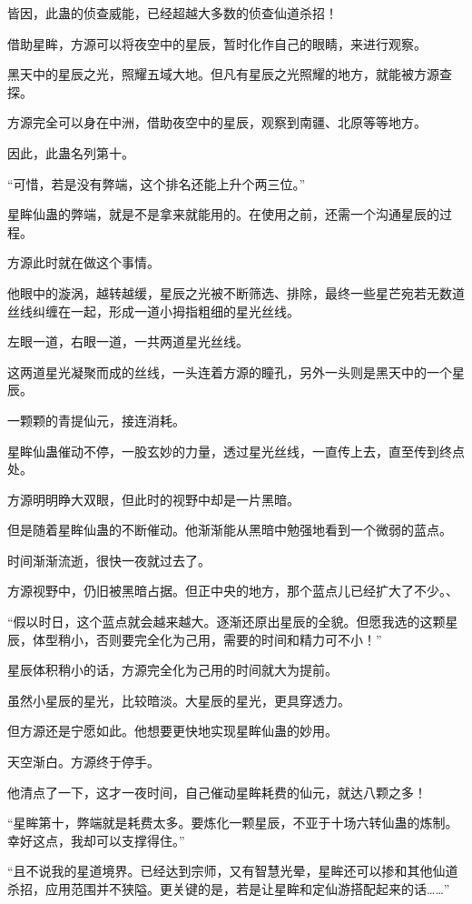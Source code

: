 \begin{this_body}
皆因，此蛊的侦查威能，已经超越大多数的侦查仙道杀招！

借助星眸，方源可以将夜空中的星辰，暂时化作自己的眼睛，来进行观察。

黑天中的星辰之光，照耀五域大地。但凡有星辰之光照耀的地方，就能被方源查探。

方源完全可以身在中洲，借助夜空中的星辰，观察到南疆、北原等等地方。

因此，此蛊名列第十。

“可惜，若是没有弊端，这个排名还能上升个两三位。”

星眸仙蛊的弊端，就是不是拿来就能用的。在使用之前，还需一个沟通星辰的过程。

方源此时就在做这个事情。

他眼中的漩涡，越转越缓，星辰之光被不断筛选、排除，最终一些星芒宛若无数道丝线纠缠在一起，形成一道小拇指粗细的星光丝线。

左眼一道，右眼一道，一共两道星光丝线。

这两道星光凝聚而成的丝线，一头连着方源的瞳孔，另外一头则是黑天中的一个星辰。

一颗颗的青提仙元，接连消耗。

星眸仙蛊催动不停，一股玄妙的力量，透过星光丝线，一直传上去，直至传到终点处。

方源明明睁大双眼，但此时的视野中却是一片黑暗。

但是随着星眸仙蛊的不断催动。他渐渐能从黑暗中勉强地看到一个微弱的蓝点。

时间渐渐流逝，很快一夜就过去了。

方源视野中，仍旧被黑暗占据。但正中央的地方，那个蓝点儿已经扩大了不少。、

“假以时日，这个蓝点就会越来越大。逐渐还原出星辰的全貌。但愿我选的这颗星辰，体型稍小，否则要完全化为己用，需要的时间和精力可不小！”

星辰体积稍小的话，方源完全化为己用的时间就大为提前。

虽然小星辰的星光，比较暗淡。大星辰的星光，更具穿透力。

但方源还是宁愿如此。他想要更快地实现星眸仙蛊的妙用。

天空渐白。方源终于停手。

他清点了一下，这才一夜时间，自己催动星眸耗费的仙元，就达八颗之多！

“星眸第十，弊端就是耗费太多。要炼化一颗星辰，不亚于十场六转仙蛊的炼制。幸好这点，我却可以支撑得住。”

“且不说我的星道境界。已经达到宗师，又有智慧光晕，星眸还可以掺和其他仙道杀招，应用范围并不狭隘。更关键的是，若是让星眸和定仙游搭配起来的话……”


\end{this_body}
